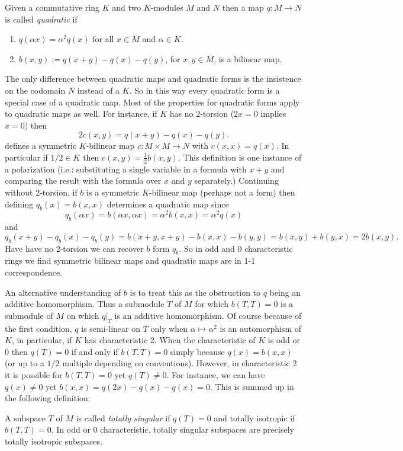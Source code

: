 \documentclass[12pt]{article}
\begin{document}
Given a commutative ring $K$ and two $K$-modules $M$ and $N$ then a map
$q:M\rightarrow N$ is called \emph{quadratic} if
\begin{enumerate}
\item $q(\alpha x)=\alpha^2 q(x)$ for all $x\in M$ and $\alpha\in K$.
\item $b(x,y):=q(x+y)-q(x)-q(y)$, for $x,y\in M$, is a bilinear map.
\end{enumerate}


The only difference between quadratic maps and quadratic forms is the insistence on the codomain $N$ instead of a $K$.  So in this way every quadratic form is a special case of a quadratic map.  Most of the properties for quadratic forms apply to quadratic maps as well.  For instance, if $K$ has no 2-torsion ($2x=0$ implies $x=0$) then 
    \[2c(x,y)=q(x+y)-q(x)-q(y).\]
defines a symmetric $K$-bilinear map $c:M\times M\to N$ with $c(x,x)=q(x)$.  In particular if $1/2\in K$ then 
$c(x,y)=\frac{1}{2}b(x,y)$.
This definition is one instance of a polarization (i.e.: substituting a single
variable in a formula with $x+y$ and comparing the result with the formula over $x$ and $y$ separately.)  Continuing
without $2$-torsion, if $b$ is a symmetric $K$-bilinear map (perhaps not a form) then defining
$q_b(x)=b(x,x)$ determines a quadratic map since
   \[q_b(\alpha x)=b(\alpha x,\alpha x)=\alpha^2 b(x,x)=\alpha^2 q(x)\]
and
\[q_b(x+y)-q_b(x)-q_b(y)
     =b(x+y,x+y)-b(x,x)-b(y,y)=b(x,y)+b(y,x)=2 b(x,y).\]
Have have no $2$-torsion we can recover $b$ form $q_b$.  So in odd and 0 characteristic rings we find symmetric 
bilinear maps and quadratic maps are in 1-1 correspondence.

An alternative understanding of $b$ is to treat this as the obstruction to
$q$ being an additive homomorphism.  Thus a submodule $T$ of $M$ for which $b(T,T)=0$ is a submodule of $M$ on which $q|_T$ is an additive homomorphism.
Of course because of the first condition, $q$ is semi-linear on $T$ only when $\alpha\mapsto \alpha^2$ is an automorphism of $K$, in particular, if $K$ has characteristic 2.  When the characteristic of $K$ is odd or 0 then $q(T)=0$ 
if and only if $b(T,T)=0$ simply because $q(x)=b(x,x)$ (or up to a $1/2$
multiple depending on conventions).  However, in characteristic 2 it is 
possible for $b(T,T)=0$ yet $q(T)\neq 0$.  For instance, we can have 
$q(x)\neq 0$ yet $b(x,x)=q(2x)-q(x)-q(x)=0$.  This is summed up in the following
definition:

A subspace $T$ of $M$ is called \emph{totally singular} if $q(T)=0$ and
totally isotropic if $b(T,T)=0$.  In odd or 0 characteristic, totally singular
subspaces are precisely totally isotropic subspaces.




\end{document}
